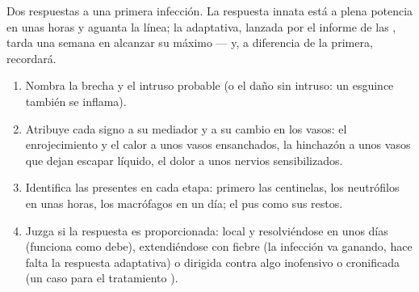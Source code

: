 \begin{omfigure}

{\small Dos respuestas a una primera infección. La respuesta innata
está a plena potencia en unas horas y aguanta la línea; la adaptativa,
lanzada por el informe de las , tarda una semana en
alcanzar su máximo --- y, a diferencia de la primera, recordará.}
\end{omfigure}

\begin{method}\label{met:g12:innate-immunity:read}
\begin{enumerate}
  \item Nombra la brecha y el intruso probable (o el daño sin intruso:
        un esguince también se inflama).
  \item Atribuye cada signo a su mediador y a su cambio en los vasos:
        el enrojecimiento y el calor a unos vasos ensanchados, la
        hinchazón a unos vasos que dejan escapar líquido, el dolor a
        unos nervios sensibilizados.
  \item Identifica las  presentes en cada etapa: primero las
        centinelas, los neutrófilos en unas horas, los macrófagos en un
        día; el pus como sus restos.
  \item Juzga si la respuesta es proporcionada: local y resolviéndose
        en unos días (funciona como debe), extendiéndose con fiebre (la
        infección va ganando, hace falta la respuesta adaptativa) o
        dirigida contra algo inofensivo o cronificada (un caso para el
        tratamiento ).
\end{enumerate}
\end{method}

